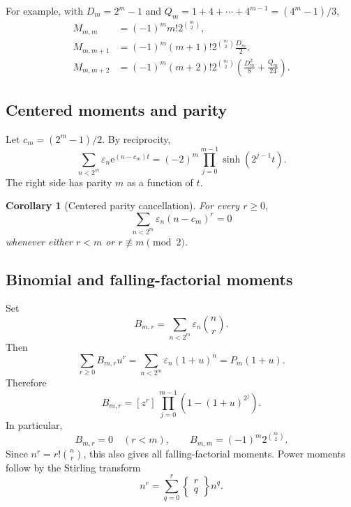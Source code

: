\documentclass[11pt,oneside]{article}
\newtheorem{corollary}[theorem]{Corollary}
\theoremstyle{definition}
\theoremstyle{remark}
\newcommand{\e}{\mathrm e}
\newcommand{\eps}{\varepsilon}
\newcommand{\coeff}[2]{[z^{#1}]\,#2}
\newcommand{\fall}[2]{#1^{\underline{#2}}}
\begin{document}
For example, with $D_m=2^m-1$ and
$Q_m=1+4+\cdots+4^{m-1}=(4^m-1)/3$,
\begin{align}
 M_{m,m}
 &=(-1)^m m!2^{\binom m2},\label{eq:moment-m}\\
 M_{m,m+1}
 &=(-1)^m(m+1)!2^{\binom m2}\frac{D_m}{2},\label{eq:moment-m1}\\
 M_{m,m+2}
 &=(-1)^m(m+2)!2^{\binom m2}
   \left(\frac{D_m^2}{8}+\frac{Q_m}{24}\right).
 \label{eq:moment-m2}
\end{align}

\subsection{Centered moments and parity}

Let $c_m=(2^m-1)/2$.  By reciprocity,
\begin{equation}\label{eq:centered-egf}
 \sum_{n<2^m}\eps_n\e^{(n-c_m)t}
 =(-2)^m\prod_{j=0}^{m-1}
   \sinh\!\left(2^{j-1}t\right).
\end{equation}
The right side has parity $m$ as a function of $t$.

\begin{corollary}[Centered parity cancellation]\label{cor:centered-parity}
For every $r\ge0$,
\begin{equation}\label{eq:centered-parity}
 \sum_{n<2^m}\eps_n(n-c_m)^r=0
\end{equation}
whenever either $r<m$ or $r\not\equiv m\pmod2$.
\end{corollary}

\subsection{Binomial and falling-factorial moments}

Set
\begin{equation}\label{eq:binomial-moment-def}
 B_{m,r}=\sum_{n<2^m}\eps_n\binom nr.
\end{equation}
Then
\begin{equation}\label{eq:binomial-moment-generating}
 \sum_{r\ge0}B_{m,r}u^r
 =\sum_{n<2^m}\eps_n(1+u)^n
 =P_m(1+u).
\end{equation}
Therefore
\begin{equation}\label{eq:binomial-moment-coeff}
 B_{m,r}=\coeff r{\prod_{j=0}^{m-1}
        \left(1-(1+u)^{2^j}\right)}.
\end{equation}
In particular,
\begin{equation}\label{eq:binomial-moment-first}
 B_{m,r}=0\quad(r<m),
 \qquad
 B_{m,m}=(-1)^m2^{\binom m2}.
\end{equation}
Since $\fall nr=r!\binom nr$, this also gives all falling-factorial moments.
Power moments follow by the Stirling transform
\begin{equation}\label{eq:stirling-transform}
 n^r=\sum_{q=0}^{r}\left\{\begin{matrix}r\\q\end{matrix}\right\}
       \fall nq.
\end{equation}
\end{document}
